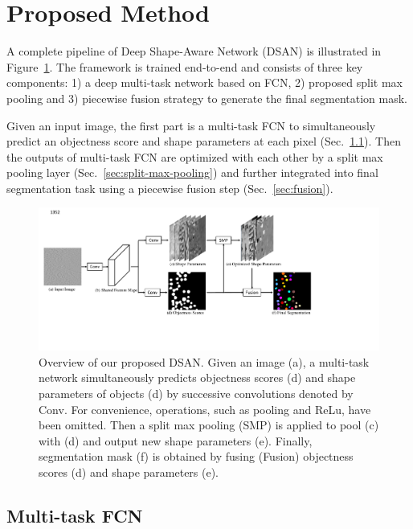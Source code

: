 \section{Proposed Method}
\label{sec:method}

A complete pipeline of Deep Shape-Aware Network (DSAN) is illustrated in Figure~\ref{FigDSAN}.
The framework is trained end-to-end and consists of three key components:
1) a deep multi-task network based on FCN,
2) proposed split max pooling and
3) piecewise fusion strategy to generate the final segmentation mask.
%

Given an input image, the first part is a multi-task FCN to simultaneously predict an objectness score and shape parameters at each pixel (Sec.~\ref{sec:multi-task-fcn}).
Then the outputs of multi-task FCN are optimized with each other by a split max pooling layer (Sec.~\ref{sec:split-max-pooling}) and further integrated into final segmentation task using a piecewise fusion step (Sec.~\ref{sec:fusion}).

\begin{figure}
    \begin{center}
        \includegraphics[width=6.7in]{figures/FigDSAN.pdf}
    \end{center}
    \caption{Overview of our proposed DSAN. Given an image (a), a multi-task network simultaneously predicts objectness scores (d) and shape parameters of objects (d) by successive convolutions denoted by Conv.
    For convenience, operations, such as pooling and ReLu, have been omitted.
    Then a split max pooling (SMP) is applied to pool (c) with (d) and output new shape parameters (e).
    Finally, segmentation mask (f) is obtained by fusing (Fusion) objectness scores (d) and shape parameters (e).}
    \label{FigDSAN}
\end{figure}
\subsection{Multi-task FCN}
\label{sec:multi-task-fcn}

